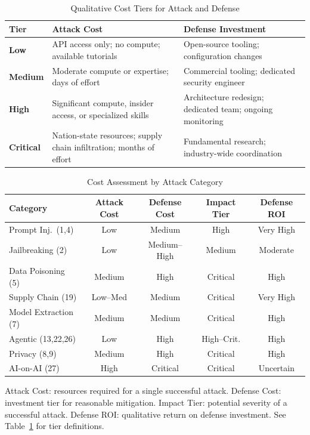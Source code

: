 \documentclass[conference]{IEEEtran}
\newcommand{\tableheaderrow}{\rowcolor{accentblue}}
\renewcommand{\thead}[1]{\textbf{\color{white}\sffamily #1}}
\begin{document}
\begin{table}[!htbp]
\centering
\caption{Qualitative Cost Tiers for Attack and Defense}
\label{tab:cost_tiers}
\renewcommand{\arraystretch}{1.1}
\scriptsize\sffamily
\begin{tabular}{p{1.3cm}p{2.5cm}p{3.0cm}}
\toprule
\tableheaderrow \thead{Tier} & \thead{Attack Cost} & \thead{Defense Investment} \\
\midrule
\rowcolor{rowalt} \textbf{Low} & API access only; no compute; available tutorials & Open-source tooling; configuration changes \\
\textbf{Medium} & Moderate compute or expertise; days of effort & Commercial tooling; dedicated security engineer \\
\rowcolor{rowalt} \textbf{High} & Significant compute, insider access, or specialized skills & Architecture redesign; dedicated team; ongoing monitoring \\
\textbf{Critical} & Nation-state resources; supply chain infiltration; months of effort & Fundamental research; industry-wide coordination \\
\bottomrule
\end{tabular}
\end{table}

\begin{table}[!htbp]
\centering
\caption{Cost Assessment by Attack Category}
\label{tab:cost_model}
\renewcommand{\arraystretch}{1.05}
\scriptsize
{}
\begin{tabular}{p{1.8cm}cccc}
\toprule
\tableheaderrow \thead{Category} & \thead{Attack Cost} & \thead{Defense Cost} & \thead{Impact Tier} & \thead{Defense ROI} \\
\midrule
Prompt Inj.\ (1,4) & Low & Medium & High & Very High \\
Jailbreaking (2) & Low & Medium--High & Medium & Moderate \\
Data Poisoning (5) & Medium & High & Critical & High \\
Supply Chain (19) & Low--Med & Medium & Critical & Very High \\
Model Extraction (7) & Medium & Medium & Critical & High \\
Agentic (13,22,26) & Low & High & High--Crit. & High \\
Privacy (8,9) & Medium & High & Critical & High \\
AI-on-AI (27) & High & Critical & Critical & Uncertain \\
\bottomrule
\end{tabular}
\begin{tablenotes}
\scriptsize
\item Attack Cost: resources required for a single successful attack. Defense Cost: investment tier for reasonable mitigation. Impact Tier: potential severity of a successful attack. Defense ROI: qualitative return on defense investment. See Table~\ref{tab:cost_tiers} for tier definitions.
\end{tablenotes}
\end{table}
\end{document}
